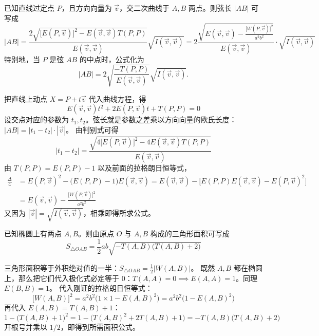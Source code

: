 \begin{conclusion}[弦长公式]
已知直线过定点 $P$，且方向向量为 $\vec{v}$，交二次曲线于 $A, B$ 两点。则弦长 $|AB|$ 可写成
$$ |AB| = \frac{2\sqrt{\big[E(P, \vec{v})\big]^2 - E(\vec{v}, \vec{v})T(P, P)}}{E(\vec{v}, \vec{v})} \sqrt{I(\vec{v}, \vec{v})} = 2 \frac{\sqrt{E(\vec{v},\vec{v}) - \frac{\big[W(P,\vec{v})\big]^2}{a^2 b^2}}}{E(\vec{v},\vec{v})} \cdot \sqrt{I(\vec{v},\vec{v})} $$
特别地，当 $P$ 是弦 $AB$ 的中点时，公式化为
\[
|AB| = 2\sqrt{\frac{-T(P,P)}{E(\vec{v}, \vec{v})}} \sqrt{I(\vec{v}, \vec{v})}.
\]
\end{conclusion}
把直线上动点 $X = P + t\vec{v}$ 代入曲线方程，得
$$ E(\vec{v},\vec{v})t^2 + 2E(P, \vec{v})t + T(P,P) = 0 $$
设交点对应的参数为 $t_1, t_2$。弦长就是参数之差乘以方向向量的欧氏长度：$|AB| = |t_1 - t_2| \cdot |\vec{v}|$。
由判别式可得
$$ |t_1 - t_2| = \frac{\sqrt{4\big[E(P, \vec{v})\big]^2 - 4E(\vec{v}, \vec{v})T(P, P)}}{E(\vec{v}, \vec{v})} $$
由 $T(P,P) = E(P,P) - 1$ 以及前面的拉格朗日恒等式，
\begin{align*}
\frac{\Delta}{4} &= E(P,\vec{v})^2 - \big(E(P,P) - 1\big)E(\vec{v},\vec{v}) = E(\vec{v},\vec{v}) - \Big[ E(P,P)E(\vec{v},\vec{v}) - E(P,\vec{v})^2 \Big] \\
&= E(\vec{v},\vec{v}) - \frac{\big[W(P,\vec{v})\big]^2}{a^2 b^2}
\end{align*}
又因为 $|\vec{v}| = \sqrt{I(\vec{v}, \vec{v})}$，相乘即得所求公式。

\begin{conclusion}
已知椭圆上有两点 $A, B$。则由原点 $O$ 与 $A,B$ 构成的三角形面积可写成
$$ S_{\triangle OAB} = \frac{1}{2} ab \sqrt{-T(A,B) \big(T(A,B)+2\big)} $$
\end{conclusion}
三角形面积等于外积绝对值的一半：$S_{\triangle OAB} = \frac{1}{2} |W(A,B)|$。
既然 $A, B$ 都在椭圆上，那么把它们代入极化式必定等于 $0$：$T(A,A)=0 \implies E(A,A) = 1$。同理 $E(B,B) = 1$。
代入刚证的拉格朗日恒等式：
$$ \big[W(A,B)\big]^2 = a^2 b^2 \big(1 \times 1 - E(A,B)^2\big) = a^2 b^2 \big(1 - E(A,B)^2\big) $$
再代入 $E(A,B) = T(A,B) + 1$：
$$ 1 - \big(T(A,B)+1\big)^2 = 1 - \big(T(A,B)^2 + 2T(A,B) + 1\big) = -T(A,B)\big(T(A,B)+2\big) $$
开根号并乘以 $1/2$，即得到所需面积公式。

